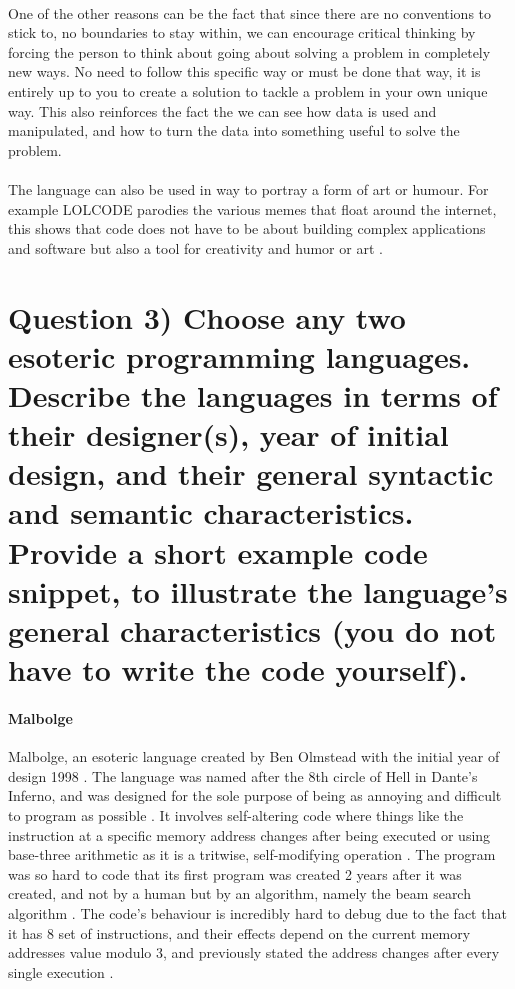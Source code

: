 \documentclass{article}
\begin{document}
\paragraph{}One of the other reasons can be the fact that since there are no conventions to stick to, no boundaries to stay within, we can encourage critical thinking by forcing the person to think about going about solving a problem in completely new ways. No need to follow this specific way or must be done that way, it is entirely up to you to create a solution to tackle a problem in your own unique way. This also reinforces the fact the we can see how data is used and manipulated, and how to turn the data into something useful to solve the problem.

\paragraph{}The language can also be used in way to portray a form of art or humour. For example LOLCODE parodies the various memes that float around the internet, this shows that code does not have to be about building complex applications and software but also a tool for creativity and humor or art \cite{esolang-chef}.

\section{Question 3) Choose any two esoteric programming languages. Describe the languages in terms of their designer(s), year of initial design, and their general syntactic and semantic characteristics. Provide a short example code snippet, to illustrate the language's general characteristics (you do not have to write the code yourself).}

\paragraph{Malbolge} Malbolge, an esoteric language created by Ben Olmstead with the initial year of design 1998 \cite{esolang-de}. The language was named after the 8th circle of Hell in Dante's Inferno, and was designed for the sole purpose of being as annoying and difficult to program as possible \cite{malbolge-epfl}. It involves self-altering code where things like the instruction at a specific memory address changes after being executed or using base-three arithmetic as it is a tritwise, self-modifying operation \cite{esolang-diff}. The program was so hard to code that its first program was created 2 years after it was created, and not by a human but by an algorithm, namely the beam search algorithm \cite{esolang-archive}. The code's behaviour is incredibly hard to debug due to the fact that it has 8 set of instructions, and their effects depend on the current memory addresses value modulo 3, and previously stated the address changes after every single execution \cite{esolang-de}.
\end{document}
